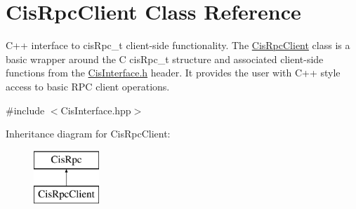 \hypertarget{classCisRpcClient}{}\section{Cis\+Rpc\+Client Class Reference}
\label{classCisRpcClient}


C++ interface to cis\+Rpc\+\_\+t client-\/side functionality. The \mbox{\hyperlink{classCisRpcClient}{Cis\+Rpc\+Client}} class is a basic wrapper around the C cis\+Rpc\+\_\+t structure and associated client-\/side functions from the \mbox{\hyperlink{CisInterface_8h_source}{Cis\+Interface.\+h}} header. It provides the user with C++ style access to basic R\+PC client operations.  




{\ttfamily \#include $<$Cis\+Interface.\+hpp$>$}

Inheritance diagram for Cis\+Rpc\+Client\+:\begin{figure}[H]
\begin{center}
\leavevmode
\includegraphics[height=2.000000cm]{classCisRpcClient}
\end{center}
\end{figure}

